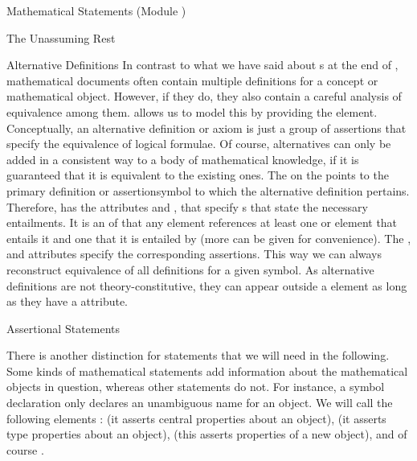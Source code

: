 \begin{tchapter}[id=statements,short=Mathematical Statements]{Mathematical Statements (Module {})}
\begin{tsection}[id=assertion]{The Unassuming Rest}
\begin{tsubsection}[id=alternative]{Alternative Definitions}
  In contrast to what we have said about {s} at the end
  of {}, mathematical documents often contain multiple
  definitions for a concept or mathematical object. However, if they do, they also contain
  a careful analysis of equivalence among them. {\omdoc} allows us to model this by
  providing the {} element.  Conceptually, an alternative definition or
  axiom is just a group of assertions that specify the equivalence of logical formulae. Of
  course, alternatives can only be added in a consistent way to a body of mathematical
  knowledge, if it is guaranteed that it is equivalent to the existing ones.  The
  {} on the {} points to the 
  {primary definition or assertion}{symbol to which the alternative definition pertains}.
  Therefore, {} has the attributes
  {} and {}, that
  specify {s} that state the necessary entailments. It is an
  {} of {\omdoc} that any {} element
  references at least one {} or {} element that
  entails it and one that it is entailed by (more can be given for convenience). The
  {}, and {}
  attributes specify the corresponding assertions. This way we can always reconstruct
  equivalence of all definitions for a given symbol. As alternative definitions are not
  theory-constitutive, they can appear outside a {} element as long as
  they have a {} attribute.
\end{tsubsection}

\begin{tsubsection}[id=assertional-statements,short=Assertional Statements]{Assertional Statements}
           
  There is another distinction for statements that we will need in the following. Some
  kinds of mathematical statements add information about the mathematical objects in
  question, whereas other statements do not. For instance, a symbol declaration only
  declares an unambiguous name for an object. We will call the following {\omdoc} elements
  {}: {} (it asserts
  central properties about an object), {} (it asserts type properties about
  an object), {} (this asserts properties of a new object), and of
  course {}.
  

\end{tsubsection}
\end{tsection}
\end{tchapter}
